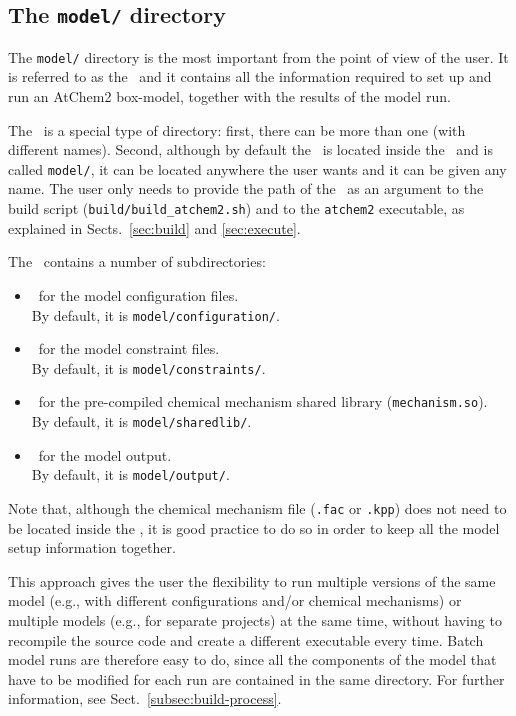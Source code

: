 \subsection{The \texttt{model/} directory} \label{subsec:model-directory}

The \texttt{model/} directory is the most important from the point of view of the user. It is
referred to as the \modeldir\ and it contains all the information required to set up and run an
AtChem2 box-model, together with the results of the model run.

The \modeldir\ is a special type of directory: first, there can be more than one (with
different names). Second, although by default the \modeldir\ is located inside the \maindir\
and is called \texttt{model/}, it can be located anywhere the user wants and it can be given
any name. The user only needs to provide the path of the \modeldir\ as an argument to the build
script (\texttt{build/build\_atchem2.sh}) and to the \texttt{atchem2} executable, as explained
in Sects.~\ref{sec:build} and \ref{sec:execute}.

The \modeldir\ contains a number of subdirectories:

\begin{itemize}
\item \configdir\ for the model configuration files.\\
  By default, it is \texttt{model/configuration/}.
\item \constrdir\ for the model constraint files.\\
  By default, it is \texttt{model/constraints/}.
\item \sharedir\ for the pre-compiled chemical mechanism shared library
  (\texttt{mechanism.so}).\\
  By default, it is \texttt{model/sharedlib/}.
\item \outdir\ for the model output.\\
  By default, it is \texttt{model/output/}.
\end{itemize}

Note that, although the chemical mechanism file (\texttt{.fac} or \texttt{.kpp}) does not need
to be located inside the \modeldir, it is good practice to do so in order to keep all the model
setup information together.

This approach gives the user the flexibility to run multiple versions of the same model (e.g.,
with different configurations and/or chemical mechanisms) or multiple models (e.g., for
separate projects) at the same time, without having to recompile the source code and create a
different executable every time. Batch model runs are therefore easy to do, since all the
components of the model that have to be modified for each run are contained in the same
directory. For further information, see Sect.~\ref{subsec:build-process}.
